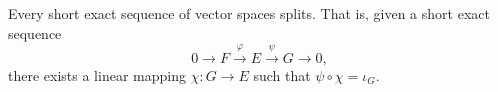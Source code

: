 Every short exact sequence of vector spaces splits. That is, given a short exact sequence
$$
0 \longrightarrow F \xrightarrow{\varphi} E \xrightarrow{\psi} G \longrightarrow 0,
$$
there exists a linear mapping $\chi: G \to E$ such that $\psi \circ \chi = \iota_G$.
